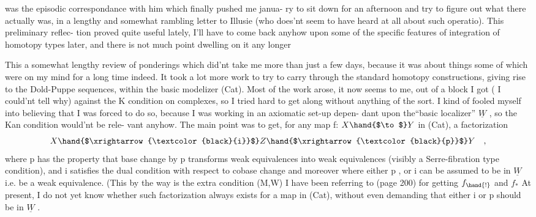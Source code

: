 was the episodic correspondance with him which finally pushed me   janua-%
ry to sit down for an afternoon and try to figure out what there actually
was, in a lengthy and somewhat rambling letter to Illusie (who does'nt
seem to have heard at all about such operatio). This preliminary reflec-%
tion proved quite useful lately, I'll have to come back anyhow upon some
of the specific features of integration of homotopy types later, and there
is not much point dwelling on it any longer  

 This  a \hand{(} somewhat lengthy\hand{!)} review of ponderings which did'nt take me
more than just a few days, because it was about things some of which were
on my mind for a long time indeed. It took  a lot more work to try to
carry through the standard homotopy constructions, giving rise to the
Dold-Puppe sequences, within the basic modelizer (Cat). Most of the work
arose, it now seems to me, out of a block I got ( I could'nt tell why)
against the K condition on complexes, so I tried hard to get along
without anything of the sort. I kind of fooled myself into believing that
I was forced to do so, because I was working in an axiomatic set-up depen-%
dant upon the``basic localizer'' $\underline{W}$ , so the Kan condition would'nt be rele-%
vant anyhow. The main point was to get, for any map f: $X \hand{$\to$} Y$ in (Cat),
a factorization
\[ X \hand{$\xrightarrow{\textcolor{black}{i}}$} Z \hand{$\xrightarrow{\textcolor{black}{p}}$} Y \quad , \]
where p has the property that base change by p transforms weak equivalences
into weak equivalences\hand{,}  (visibly a Serre-fibration type condition),
and i satisfies the dual condition with respect to co\hand{-}base change\hand{;} and
moreover where either p , or i can be assumed to be in $\underline{W}$ i.e.  be a weak
equivalence. (This\hand{,} by the way\hand{,} is the extra condition  (M,W) I
have been referring to   (page 200)\deleted{\unsure{)}}\hand{,} for  getting $f_{\hand{!}}$ and $f_{*}$ 
At present, I do not yet know whether such factorization  always
exists for a map in (Cat), without even  demanding that either i
or p should be in $\underline{W}$ . \hand{$\Vert$}

